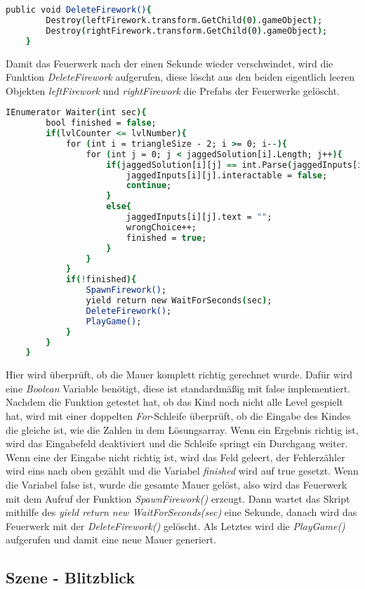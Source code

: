 \begin{lstlisting}[language=csh, caption={Triangle.cs DeleteFirework-Funktion}]
	public void DeleteFirework(){
		Destroy(leftFirework.transform.GetChild(0).gameObject);
		Destroy(rightFirework.transform.GetChild(0).gameObject);
	}
\end{lstlisting}
Damit das Feuerwerk nach der einen Sekunde wieder verschwindet, wird die Funktion \textit{DeleteFirework} aufgerufen, diese löscht aus den beiden eigentlich leeren Objekten \textit{leftFirework} und \textit{rightFirework} die Prefabs der Feuerwerke gelöscht.\\
\begin{lstlisting}[language=csh, caption={Triangle.cs Waiter-Funktion}]
	IEnumerator Waiter(int sec){
		bool finished = false;
		if(lvlCounter <= lvlNumber){
			for (int i = triangleSize - 2; i >= 0; i--){
				for (int j = 0; j < jaggedSolution[i].Length; j++){
					if(jaggedSolution[i][j] == int.Parse(jaggedInputs[i][j].text)){
						jaggedInputs[i][j].interactable = false;
						continue;
					}
					else{
						jaggedInputs[i][j].text = "";
						wrongChoice++;
						finished = true;
					}
				}
			}
			if(!finished){
				SpawnFirework();
				yield return new WaitForSeconds(sec);
				DeleteFirework();
				PlayGame();
			}
		}
	}
\end{lstlisting}
Hier wird überprüft, ob die Mauer komplett richtig gerechnet wurde. Dafür wird eine \textit{Boolean} Variable benötigt, diese ist standardmäßig mit false implementiert. Nachdem die Funktion getestet hat, ob das Kind noch nicht alle Level gespielt hat, wird mit einer doppelten \textit{For}-Schleife überprüft, ob die Eingabe des Kindes die gleiche ist, wie die Zahlen in dem Lösungsarray. Wenn ein Ergebnis richtig ist, wird das Eingabefeld deaktiviert und die Schleife springt ein Durchgang weiter. Wenn eine der Eingabe nicht richtig ist, wird das Feld geleert, der Fehlerzähler wird eins nach oben gezählt und die Variabel \textit{finished} wird auf true gesetzt. Wenn die Variabel false ist, wurde die gesamte Mauer gelöst, also wird das Feuerwerk mit dem Aufruf der Funktion \textit{SpawnFirework()} erzeugt. Dann wartet das Skript mithilfe des \textit{yield return new WaitForSeconds(sec)} eine Sekunde, danach wird das Feuerwerk mit der \textit{DeleteFirework()} gelöscht. Als Letztes wird die \textit{PlayGame()} aufgerufen und damit eine neue Mauer generiert.\\
\subsection{Szene - Blitzblick}
